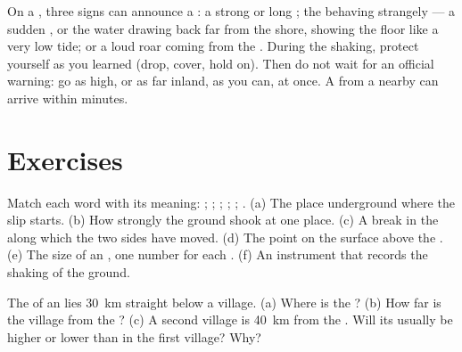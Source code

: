 \begin{remark}\label{rem:g7:earthquakes:natural-warning}
On a , three signs can announce a : a strong or long
; the  behaving strangely --- a sudden , or the water
drawing back far from the shore, showing the  floor like a very low
tide; or a loud roar coming from the . During the shaking, protect
yourself as you learned (drop, cover, hold on). Then do not wait for an
official warning: go as high, or as far inland, as you can, at once. A
 from a nearby  can arrive within minutes.
\end{remark}


\section{Exercises}

\begin{exercise}[$\star$]\label{exo:g7:earthquakes:1}
Match each word with its meaning: ; ; ; ;
; . (a) The place underground where the slip starts. (b)
How strongly the ground shook at one place. (c) A break in the  along
which the two sides have moved. (d) The point on the surface above the
. (e) The size of an , one number for each . (f)
An instrument that records the shaking of the ground.
\end{exercise}

\begin{exercise}[$\star$]\label{exo:g7:earthquakes:2}
The  of an  lies \qty{30}{km} straight below a village.
(a) Where is the ? (b) How far is the village from the ?
(c) A second village is \qty{40}{km} from the . Will its
 usually be higher or lower than in the first village? Why?
\end{exercise}

